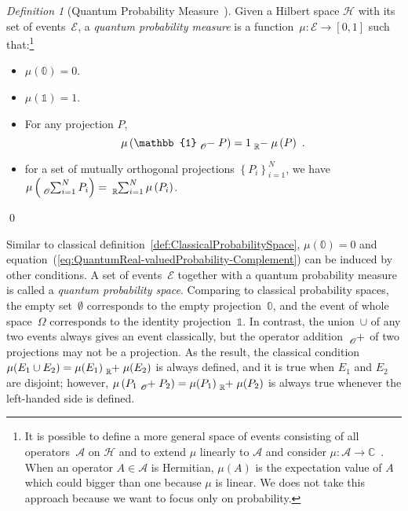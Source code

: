 \documentclass{article}
\theoremstyle{remark}
\newtheorem{definition}{Definition}
\newcommand{\events}{\ensuremath{\mathcal{E}}}
\newcommand{\pmeas}{\ensuremath{\mu}}
\newcommand{\Hilb}{\mathcal{H}}
\def\C{{\mathbb{C}}}
\begin{document}
\begin{definition}[Quantum Probability Measure~\cite{10.2307/2308516,gleason1957,Redhead1987-REDINA,Maassen2010}]\label{def:QuantumProbabilitySpace}
Given a Hilbert space $\Hilb$ with its set of events~$\events$,
a \emph{quantum probability measure} is a function~$\mu:\events\rightarrow[0,1]$
such that:\footnote{It is possible to define a more general space of events consisting
of all operators~$\mathcal{A}$ on $\Hilb$ and to extend $\mu$
linearly to $\mathcal{A}$ and consider $\mu:\mathcal{A}\rightarrow\C$~\cite{Maassen2010,Swart2013}.
When an operator $A\in\mathcal{A}$ is Hermitian, $\mu\left(A\right)$
is the expectation value of $A$ which could bigger than one because
$\mu$ is linear. We does not take this approach because we want to
focus only on probability. } 
\begin{itemize}
\item $\mu(\mathbb{0})=0$. 
\item $\mu(\mathbb{1})=1$. 
\item For any projection $P$, 
\begin{equation}
\mu\left(\mathbb{1}\tensor*[_{\mathscr{O}}]{-}{}P\right)=1\tensor*[_{\mathbb{R}}]{-}{}\mu\left(P\right)\textrm{ .}\label{eq:QuantumReal-valuedProbability-Complement}
\end{equation}
\item for a set of mutually orthogonal projections $\left\{ P_{i}\right\} _{i=1}^{N}$,
we have $\mu\left(\tensor*[_{\mathscr{O}}]{\sum}{_{i=1}^{N}}P_{i}\right)=\tensor*[_{\mathbb{R}}]{\sum}{_{i=1}^{N}}\mu\left(P_{i}\right)$. 
\end{itemize}
\qed\end{definition}

Similar to classical definition~\ref{def:ClassicalProbabilitySpace},
$\mu(\mathbb{0})=0$ and equation~(\ref{eq:QuantumReal-valuedProbability-Complement})
can be induced by other conditions. A set of events~$\events$ together
with a quantum probability measure is called a \emph{quantum probability
space}. Comparing to classical probability spaces, the empty set~$\emptyset$
corresponds to the empty projection~$\mathbb{0}$, and the event
of whole space~$\Omega$ corresponds to the identity projection~$\mathbb{1}$.
In contrast, the union~$\cup$ of any two events always gives an
event classically, but the operator addition~$\tensor*[_{\mathscr{O}}]{+}{}$
of two projections may not be a projection. As the result, the classical
condition~$\pmeas(E_{1}\cup E_{2})=\pmeas(E_{1})\tensor*[_{\mathbb{R}}]{+}{}\pmeas(E_{2})$
is always defined, and it is true when $E_{1}$ and $E_{2}$ are disjoint;
however, $\mu\left(P_{1}\tensor*[_{\mathscr{O}}]{+}{}P_{2}\right)=\mu(P_{1})\tensor*[_{\mathbb{R}}]{+}{}\mu(P_{2})$
is always true whenever the left-handed side is defined.
\end{document}
